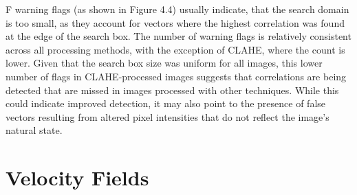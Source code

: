 \FloatBarrier
F warning flags (as shown in Figure 4.4) usually indicate, that the search domain is too small\cite{TutorialUVMAT}, as they account for vectors where the highest correlation was found at the edge of the search box. The number of warning flags is relatively consistent across all processing methods, with the exception of CLAHE, where the count is lower. Given that the search box size was uniform for all images, this lower number of flags in CLAHE-processed images suggests that correlations are being detected that are missed in images processed with other techniques. While this could indicate improved detection, it may also point to the presence of false vectors resulting from altered pixel intensities that do not reflect the image's natural state.

\section{Velocity Fields}

